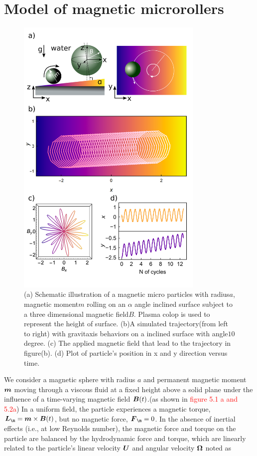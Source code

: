 \section{Model of  magnetic microrollers}
\begin{figure}[p]
\centering
\includegraphics[width=9cm]{figures/5_1.png}
\caption{ (a) Schematic illustration of a magnetic micro particles with radius$a$, magnetic moment$m$ rolling on an $\alpha$ angle inclined surface subject to a three dimensional magnetic field$B$. Plasma colop is used to represent the height of surface. (b)A simulated trajectory(from left to right) with gravitaxis behaviors on a inclined surface with angle$10$ degree. (c) The applied magnetic field that lead to the trajectory in figure(b). (d) Plot of particle's position in x and y direction versus time.}
\label{fig:1}
\end{figure}
We consider a magnetic sphere with radius $a$ and permanent magnetic moment $\boldsymbol{m}$ moving through a viscous fluid at a fixed height above a solid plane under the influence of a time-varying magnetic field $\boldsymbol{B}(t)$.(as shown in \textcolor{red}{figure 5.1 a and 5.2a}) In a uniform field, the particle experiences a magnetic torque, $\ve{L}_{\m}=\ve{m}\times\ve{B}(t)$, but no magnetic force, $\ve{F}_{\m}=0$. In the absence of inertial effects (i.e., at low Reynolds number), the magnetic force and torque on the particle are balanced by the hydrodynamic force and torque, which are linearly related to the particle's linear velocity $\boldsymbol{U}$ and angular velocity $\boldsymbol{\Omega}$ noted as
